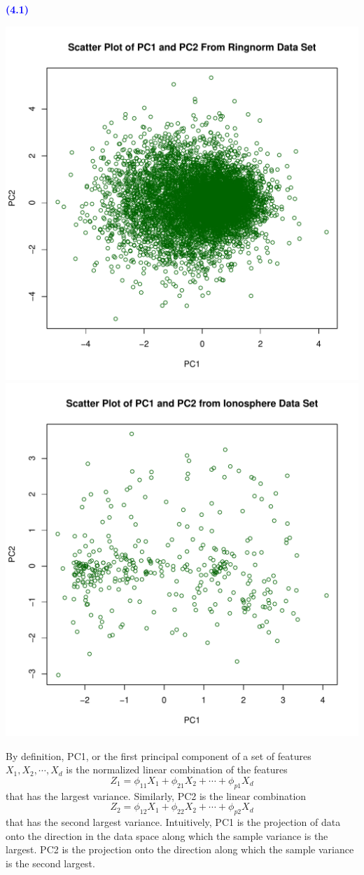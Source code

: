 \documentclass[a4paper,12pt]{article}
\newcommand{\qnum}[1]{\noindent\textcolor{blue}{\textbf{(#1)}}}
\begin{document}
\qnum{4.1}
\begin{center}
  \includegraphics[width=0.7\linewidth]{Image/Prob4-1-Ringnorm.pdf}
  \includegraphics[width=0.7\linewidth]{Image/Prob4-1-Ionosphere.pdf}
\end{center}

By definition, PC1, or the first principal component of a set of features $X_1, X_2, \cdots, X_d$ is the normalized linear combination of the features
\[
    Z_1 = \phi_{11}X_1 + \phi_{21}X_2 + \cdots + \phi_{p1}X_d
\]
that has the largest variance. Similarly, PC2 is the linear combination
\[
    Z_2 = \phi_{12}X_1 + \phi_{22}X_2 + \cdots + \phi_{p2}X_d
\]
that has the second largest variance.
Intuitively, PC1 is the projection of data onto the direction in the data space along which the sample variance is the largest. PC2 is the projection onto the direction along which the sample variance is the second largest.
\end{document}
